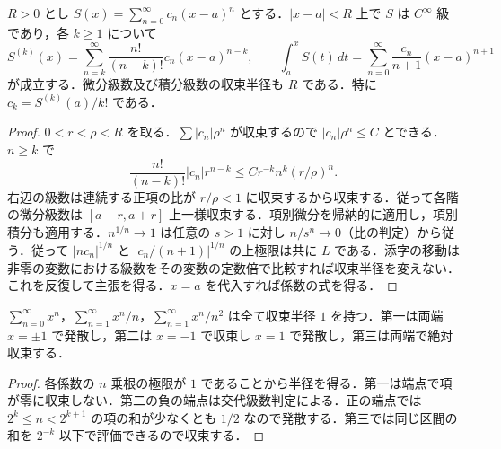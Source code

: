 \begin{prop}[冪級数の項別微積分]
$R>0$ とし $S(x)=\sum_{n=0}^\infty c_n(x-a)^n$ とする．$|x-a|<R$ 上で $S$ は $C^\infty$ 級であり，各 $k\geq1$ について
\[
S^{(k)}(x)=\sum_{n=k}^\infty\frac{n!}{(n-k)!}c_n(x-a)^{n-k},\qquad
\int_a^xS(t)\,dt=\sum_{n=0}^\infty\frac{c_n}{n+1}(x-a)^{n+1}
\]
が成立する．微分級数及び積分級数の収束半径も $R$ である．特に $c_k=S^{(k)}(a)/k!$ である．
\end{prop}
\begin{proof}
$0<r<\rho<R$ を取る．$\sum|c_n|\rho^n$ が収束するので $|c_n|\rho^n\leq C$ とできる．$n\geq k$ で
\[
\frac{n!}{(n-k)!}|c_n|r^{n-k}\leq Cr^{-k}n^k(r/\rho)^n.
\]
右辺の級数は連続する正項の比が $r/\rho<1$ に収束するから収束する．従って各階の微分級数は $[a-r,a+r]$ 上一様収束する．項別微分を帰納的に適用し，項別積分も適用する．$n^{1/n}\to1$ は任意の $s>1$ に対し $n/s^n\to0$（比の判定）から従う．従って $|nc_n|^{1/n}$ と $|c_n/(n+1)|^{1/n}$ の上極限は共に $L$ である．添字の移動は非零の変数における級数をその変数の定数倍で比較すれば収束半径を変えない．これを反復して主張を得る．$x=a$ を代入すれば係数の式を得る．
\end{proof}
\begin{example}[収束半径の境界での相違]
$\sum_{n=0}^\infty x^n$，$\sum_{n=1}^\infty x^n/n$，$\sum_{n=1}^\infty x^n/n^2$ は全て収束半径 $1$ を持つ．第一は両端 $x=\pm1$ で発散し，第二は $x=-1$ で収束し $x=1$ で発散し，第三は両端で絶対収束する．
\end{example}
\begin{proof}
各係数の $n$ 乗根の極限が $1$ であることから半径を得る．第一は端点で項が零に収束しない．第二の負の端点は交代級数判定による．正の端点では $2^k\leq n<2^{k+1}$ の項の和が少なくとも $1/2$ なので発散する．第三では同じ区間の和を $2^{-k}$ 以下で評価できるので収束する．
\end{proof}
